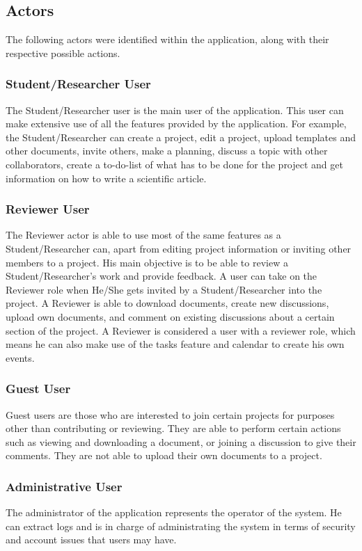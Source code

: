 \subsection{Actors} %
\label{sub:actors}
The following actors were identified within the application, along with their respective possible actions.
\subsubsection{Student/Researcher User} 
The Student/Researcher user is the main user of the application. This user can make extensive use of all the features provided by the application. 
For example, the Student/Researcher can create a project, edit a project, upload templates and other documents, invite others, make a planning, discuss 
a topic with other collaborators, create a to-do-list of what has to be done for the project and get information on how to write a scientific article.

\subsubsection{Reviewer User} 
The Reviewer actor is able to use most of the same features as a Student/Researcher can, apart from editing project information or inviting other 
members to a project. His main objective is to be able to review a Student/Researcher's work and provide feedback. A user can take on the Reviewer role 
when He/She gets invited by a Student/Researcher into the project. A Reviewer is able to download documents, create new discussions, upload own 
documents, and comment on existing discussions about a certain section of the project. A Reviewer is considered a user with a reviewer role, which 
means he can also make use of the tasks feature and calendar to create his own events.

\subsubsection{Guest User} 
Guest users are those who are interested to join certain projects for purposes other than contributing or reviewing. They are able to perform certain
actions such as viewing and downloading a document, or joining a discussion to give their comments. They are not able to upload their own documents to 
a project.

\subsubsection{Administrative User} 
The administrator of the application represents the operator of the system. He can extract logs and is in charge of administrating the system in terms 
of security and account issues that users may have.

